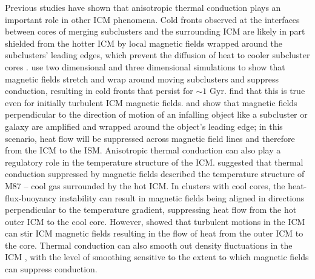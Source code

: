 \documentclass[twocolumn]{aastex6}
\begin{document}
Previous studies have shown that anisotropic thermal conduction plays an important role in other ICM phenomena. Cold fronts observed at the interfaces between cores of merging subclusters and the surrounding ICM are likely in part shielded from the hotter ICM by local magnetic fields wrapped around the subclusters' leading edges, which prevent the diffusion of heat to cooler subcluster cores  \citep[e.g.,][]{Asai04,Asai05,Asai07,ZuHone13,Komarov14}. \citet{Asai04,Asai05} use two dimensional and three dimensional simulations to show that magnetic fields stretch and wrap around moving subclusters and suppress conduction, resulting in cold fronts that persist for $\sim 1$ Gyr. \citet{Asai07} find that this is true even for initially turbulent ICM magnetic fields. \citet{Lyutikov06} and \cite{Dursi08} show that magnetic fields perpendicular to the direction of motion of an infalling object like a subcluster or galaxy are amplified and wrapped around the object's leading edge; in this scenario, heat flow will be suppressed across magnetic field lines and therefore from the ICM to the ISM.  Anisotropic thermal conduction can also play a regulatory role in the temperature structure of the ICM. \citet{Binney81} suggested that thermal conduction suppressed by magnetic fields described the temperature structure of M87 -- cool gas surrounded by the hot ICM. In clusters with cool cores, the heat-flux-buoyancy instability \citep[HBI,][]{Balbus08,Quataert08,Parrish08,Parrish09,Bogdanovic09} can result in magnetic fields  being aligned in directions perpendicular to the temperature gradient, suppressing heat flow from the hot outer ICM to the cool core. However, \citet{Ruszkowski10,Ruszkowski11} showed that turbulent motions in the ICM can stir ICM magnetic fields resulting in the flow of heat from the outer ICM to the core. Thermal conduction can also smooth out density fluctuations in the ICM \citep{Gaspari13,Gaspari14}, with the level of smoothing sensitive to the extent to which magnetic fields can suppress conduction.
\end{document}
